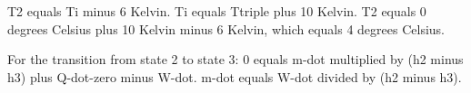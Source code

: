 T2 equals Ti minus 6 Kelvin.  
Ti equals Ttriple plus 10 Kelvin.  
T2 equals 0 degrees Celsius plus 10 Kelvin minus 6 Kelvin, which equals 4 degrees Celsius.  

For the transition from state 2 to state 3:  
0 equals m-dot multiplied by (h2 minus h3) plus Q-dot-zero minus W-dot.  
m-dot equals W-dot divided by (h2 minus h3).